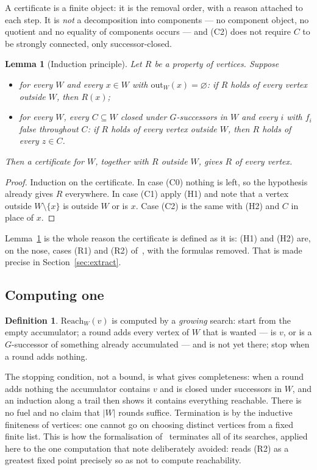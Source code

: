 \documentclass[11pt,a4paper]{article}
\newtheorem{lemma}[theorem]{Lemma}
\theoremstyle{definition}
\newtheorem{definition}[theorem]{Definition}
\newcommand{\Reach}{\mathrm{Reach}}
\newcommand{\outs}{\mathrm{out}}
\begin{document}
A certificate is a finite object: it is the removal order, with a reason
attached to each step.  It is \emph{not} a decomposition into components ---
no component object, no quotient and no equality of components occurs --- and
(C2) does not require $C$ to be strongly connected, only successor-closed.

\begin{lemma}[Induction principle]\label{lem:certall}
Let $R$ be a property of vertices.  Suppose
\begin{itemize}
\item[(H1)] for every $W$ and every $x\in W$ with $\outs_W(x)=\varnothing$: if
  $R$ holds of every vertex outside $W$, then $R(x)$;
\item[(H2)] for every $W$, every $C\subseteq W$ closed under $G$-successors in
  $W$ and every $i$ with $f_i$ false throughout $C$: if $R$ holds of every
  vertex outside $W$, then $R$ holds of every $z\in C$.
\end{itemize}
Then a certificate for $W$, together with $R$ outside $W$, gives $R$ of every
vertex.
\end{lemma}

\begin{proof}
Induction on the certificate.  In case (C0) nothing is left, so the hypothesis
already gives $R$ everywhere.  In case (C1) apply (H1) and note that a vertex
outside $W\setminus\{x\}$ is outside $W$ or is $x$.  Case (C2) is the same with
(H2) and $C$ in place of $x$.
\end{proof}

Lemma~\ref{lem:certall} is the whole reason the certificate is defined as it
is: (H1) and (H2) are, on the nose, cases (R1) and (R2)
of~\cite[Def.~3.1]{m4}, with the formulas removed.  That is made precise in
Section~\ref{sec:extract}.

\subsection*{Computing one}

\begin{definition}\label{def:reach}
$\Reach_W(v)$ is computed by a \emph{growing} search: start from the empty
accumulator; a round adds every vertex of $W$ that is wanted --- is $v$, or is
a $G$-successor of something already accumulated --- and is not yet there; stop
when a round adds nothing.
\end{definition}

The stopping condition, not a bound, is what gives completeness: when a round
adds nothing the accumulator contains $v$ and is closed under successors in
$W$, and an induction along a trail then shows it contains everything reachable.
There is no fuel and no claim that $|W|$ rounds suffice.  Termination is by the
inductive finiteness of vertices: one cannot go on choosing distinct vertices
from a fixed finite list.  This is how the formalisation of~\cite{m4}
terminates all of its searches, applied here to the one computation that note
deliberately avoided: \cite[Rem.~3.2]{m4} reads (R2) as a greatest fixed point
precisely so as not to compute reachability.
\end{document}
